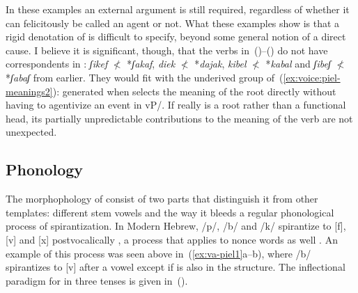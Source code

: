{In these examples an external argument is still required, regardless of whether it can felicitously be called an agent or not. What these examples show is that a rigid denotation of {\va} is difficult to specify, beyond some general notion of a direct cause. I believe it is significant, though, that the verbs in~(\blastx)--(\lastx) do not have correspondents in {\tkal}: \emph{ʃikef} $\nless$ *\emph{ʃakaf}, \emph{diek} $\nless$ *\emph{dajak}, \emph{kibel} $\nless$ *\emph{kabal} and \emph{ʃibeʃ} $\nless$ *\emph{ʃabaʃ} from earlier. They would fit with the underived group of~(\ref{ex:voice:piel-meanings2}): generated when {\va} selects the meaning of the root directly without having to agentivize an event in vP/{\tkal}. If {\va} really is a root rather than a functional head, its partially unpredictable contributions to the meaning of the verb are not unexpected.

	\subsection{Phonology} \label{voice:va:phono}
The morphophology of {\tpie} consist of two parts that distinguish it from other templates: different stem vowels and the way it bleeds a regular phonological process of spirantization. In Modern Hebrew, /p/, /b/ and /k/ spirantize to [f], [v] and [x] postvocalically \citep{adam02,temkinmartinez08wccfl,gouskova12nllt}, a process that applies to nonce words as well \citep{temkinmartinzemuellner16}. An example of this process was seen above in~(\ref{ex:va-piel1}a--b), where /b/ spirantizes to [v] after a vowel except if {\va} is also in the structure. The inflectional paradigm for {\tpie} in three tenses is given in~(\nextx).

}
